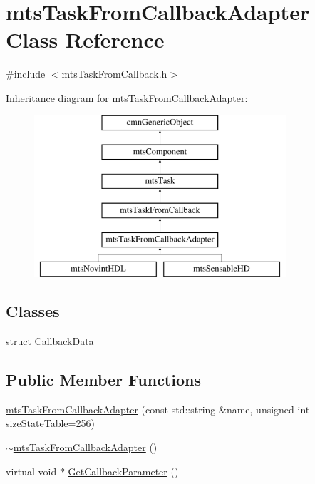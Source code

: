 \hypertarget{classmts_task_from_callback_adapter}{\section{mts\-Task\-From\-Callback\-Adapter Class Reference}
\label{classmts_task_from_callback_adapter}
}


{\ttfamily \#include $<$mts\-Task\-From\-Callback.\-h$>$}

Inheritance diagram for mts\-Task\-From\-Callback\-Adapter\-:\begin{figure}[H]
\begin{center}
\leavevmode
\includegraphics[height=6.000000cm]{dc/d60/classmts_task_from_callback_adapter}
\end{center}
\end{figure}
\subsection*{Classes}
\begin{DoxyCompactItemize}
\item 
struct \hyperlink{structmts_task_from_callback_adapter_1_1_callback_data}{Callback\-Data}
\end{DoxyCompactItemize}
\subsection*{Public Member Functions}
\begin{DoxyCompactItemize}
\item 
\hyperlink{classmts_task_from_callback_adapter_a947196044b8b4849a0ab79fa054dae80}{mts\-Task\-From\-Callback\-Adapter} (const std\-::string \&name, unsigned int size\-State\-Table=256)
\item 
\hyperlink{classmts_task_from_callback_adapter_ac6a5ae13c1e7c75002a77cac3a8c481a}{$\sim$mts\-Task\-From\-Callback\-Adapter} ()
\item 
virtual void $\ast$ \hyperlink{classmts_task_from_callback_adapter_ae601440d7960f78f80a633e84176bfac}{Get\-Callback\-Parameter} ()
\end{DoxyCompactItemize}
